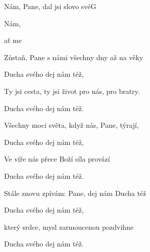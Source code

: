 \begin{song}{Nám, Pane, dal jsi slovo své}{G}{}

\begin{SBChorus}

Nám, 

 

ať   me


\end{SBChorus}

\begin{SBVerse}

Zůstaň, Pane s námi všechny dny až na věky

Ducha svého dej nám též,

Ty jsi cesta, ty jsi život pro nás, pro bratry.

Ducha svého dej nám též.

\end{SBVerse}

\begin{SBVerse}

Všechny moci světa, když nás, Pane, týrají,

Ducha svého dej nám též,

Ve víře nás přece Boží síla provází

Ducha svého dej nám též.

\end{SBVerse}

\begin{SBVerse}

Stále znovu zpívám: Pane, dej nám Ducha též

Ducha svého dej nám též,

který srdce, mysl zarmoucenou pozdvihne

Ducha svého dej nám též.

\end{SBVerse}

\end{song}
